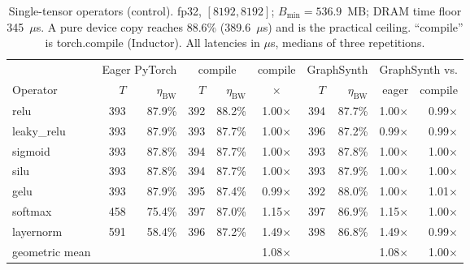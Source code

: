 \documentclass[10pt,twocolumn]{article}
\newcommand{\tc}{torch.compile}
\begin{document}
\begin{table}[t]
\centering
\caption{Single-tensor operators (control). fp32, $[8192,8192]$; $B_{\min}=536.9$~MB;
DRAM time floor 345~$\mu$s. A pure device copy reaches 88.6\% (389.6~$\mu$s) and is the
practical ceiling. ``compile'' is \tc{} (Inductor). All latencies in $\mu$s, medians of
three repetitions.}
\label{tab:single}
\setlength{\tabcolsep}{3pt}
\begin{tabular}{lrrrrcrrrr}
\toprule
& \multicolumn{2}{c}{Eager PyTorch} & \multicolumn{2}{c}{compile}
& compile & \multicolumn{2}{c}{GraphSynth} & \multicolumn{2}{c}{GraphSynth vs.} \\
\cmidrule(lr){2-3}\cmidrule(lr){4-5}\cmidrule(lr){7-8}\cmidrule(lr){9-10}
Operator & $T$ & $\eta_{\text{BW}}$ & $T$ & $\eta_{\text{BW}}$ & $\times$
& $T$ & $\eta_{\text{BW}}$ & eager & compile \\
\midrule
relu        & 393 & 87.9\% & 392 & 88.2\% & 1.00$\times$ & 394 & 87.7\% & 1.00$\times$ & 0.99$\times$ \\
leaky\_relu & 393 & 87.9\% & 393 & 87.7\% & 1.00$\times$ & 396 & 87.2\% & 0.99$\times$ & 0.99$\times$ \\
sigmoid     & 393 & 87.8\% & 394 & 87.7\% & 1.00$\times$ & 393 & 87.8\% & 1.00$\times$ & 1.00$\times$ \\
silu        & 393 & 87.8\% & 394 & 87.7\% & 1.00$\times$ & 393 & 87.9\% & 1.00$\times$ & 1.00$\times$ \\
gelu        & 393 & 87.9\% & 395 & 87.4\% & 0.99$\times$ & 392 & 88.0\% & 1.00$\times$ & 1.01$\times$ \\
softmax     & 458 & 75.4\% & 397 & 87.0\% & 1.15$\times$ & 397 & 86.9\% & 1.15$\times$ & 1.00$\times$ \\
layernorm   & 591 & 58.4\% & 396 & 87.2\% & 1.49$\times$ & 398 & 86.8\% & 1.49$\times$ & 0.99$\times$ \\
\midrule
geometric mean & & & & & 1.08$\times$ & & & 1.08$\times$ & 1.00$\times$ \\
\bottomrule
\end{tabular}
\end{table}
\end{document}

